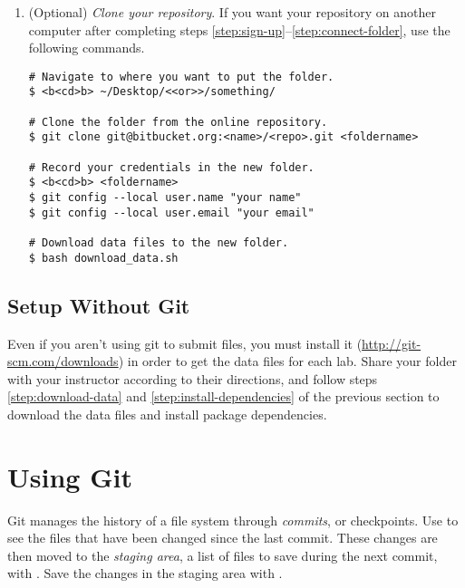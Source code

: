 \begin{enumerate}
\item (Optional) \emph{Clone your repository}.
If you want your repository on another computer after completing steps \ref{step:sign-up}--\ref{step:connect-folder}, use the following commands.

\begin{lstlisting}
# Navigate to where you want to put the folder.
$ <b<cd>b> ~/Desktop/<<or>>/something/

# Clone the folder from the online repository.
$ git clone git@bitbucket.org:<name>/<repo>.git <foldername>

# Record your credentials in the new folder.
$ <b<cd>b> <foldername>
$ git config --local user.name "your name"
$ git config --local user.email "your email"

# Download data files to the new folder.
$ bash download_data.sh
\end{lstlisting}
\end{enumerate}

\subsection*{Setup Without Git} %

Even if you aren't using git to submit files, you must install it (\url{http://git-scm.com/downloads}) in order to get the data files for each lab.
Share your folder with your instructor according to their directions, and follow steps \ref{step:download-data} and \ref{step:install-dependencies} of the previous section to download the data files and install package dependencies.

\section*{Using Git} %

Git manages the history of a file system through \emph{commits}, or checkpoints.
Use  to see the files that have been changed since the last commit.
These changes are then moved to the \emph{staging area}, a list of files to save during the next commit, with .
Save the changes in the staging area with .

